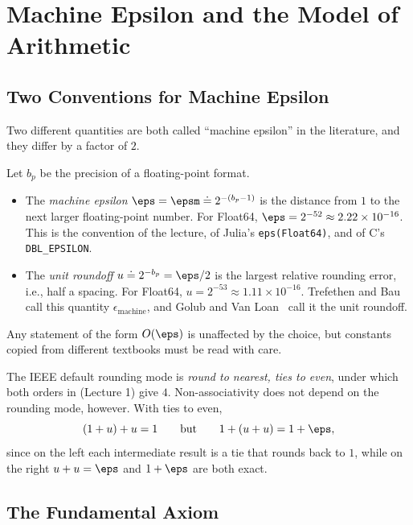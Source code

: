 \section{Machine Epsilon and the Model of Arithmetic}

\subsection{Two Conventions for Machine Epsilon}

Two different quantities are both called ``machine epsilon'' in the literature, and they differ by a factor of $2$.

\begin{definition}
  \label{def:eps}
  Let $b_p$ be the precision of a floating-point format.
  \begin{itemize}
    \item The \emph{machine epsilon} $\eps = \epsm \doteq 2^{-(b_p - 1)}$ is the distance from $1$ to the next larger floating-point number. For Float64, $\eps = 2^{-52} \approx 2.22 \times 10^{-16}$. This is the convention of the lecture, of Julia's \texttt{eps(Float64)}, and of C's \texttt{DBL\_EPSILON}.
    \item The \emph{unit roundoff} $u \doteq 2^{-b_p} = \eps/2$ is the largest relative rounding error, i.e., half a spacing. For Float64, $u = 2^{-53} \approx 1.11 \times 10^{-16}$. Trefethen and Bau~\cite{TB} call this quantity $\epsilon_{\text{machine}}$, and Golub and Van Loan~\cite{GVL} call it the unit roundoff.
  \end{itemize}
\end{definition}

Any statement of the form $O(\eps)$ is unaffected by the choice, but constants copied from different textbooks must be read with care.

The IEEE default rounding mode is \emph{round to nearest, ties to even}, under which both orders in  (Lecture 1) give $4$. Non-associativity does not depend on the rounding mode, however. With ties to even,
\begin{equation}
  (1 + u) + u = 1 \qquad \text{but} \qquad 1 + (u + u) = 1 + \eps,
\end{equation}
since on the left each intermediate result is a tie that rounds back to $1$, while on the right $u + u = \eps$ and $1 + \eps$ are both exact.

\subsection{The Fundamental Axiom}

